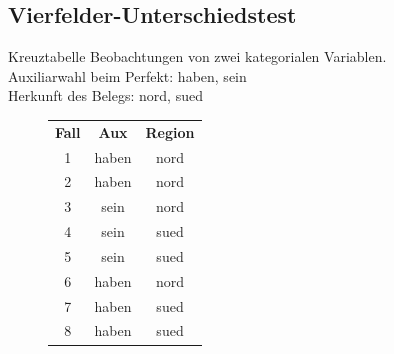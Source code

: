 \subsection{Vierfelder-Unterschiedstest}

\begin{frame}{Kreuztabelle}
  Beobachtungen von zwei \alert{kategorialen Variablen}.\\
  Auxiliarwahl beim Perfekt: haben, sein\\
  Herkunft des Belegs: nord, sued\\

\begin{figure}[h]
  \centering
  \begin{tabular}{ccc}
    \textbf{Fall} & \textbf{Aux} & \textbf{Region} \\
          1       & haben        & nord   \\
          2       & haben        & nord   \\
          3       & sein         & nord  \\
          4       & sein         & sued  \\
          5       & sein         & sued   \\
          6       & haben        & nord   \\
          7       & haben        & sued   \\
          8       & haben        & sued  \\             
  \end{tabular}
\end{figure}
\end{frame}


